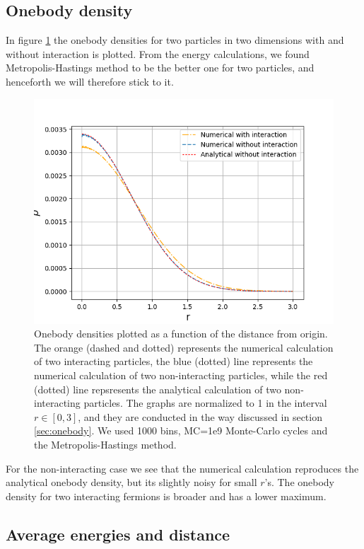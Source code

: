 \documentclass[norsk,a4paper,12pt]{article}
\begin{document}
\subsection{Onebody density}
In figure \ref{fig:OB} the onebody densities for two particles in two dimensions with and without interaction is plotted. From the energy calculations, we found Metropolis-Hastings method to be the better one for two particles, and henceforth we will therefore stick to it. 
 \begin{figure} [H]
 	\centering
 	\includegraphics[scale=0.8]{plots/OB_comparison_MC_1e9.png}
 	\caption{Onebody densities plotted as a function of the distance from origin. The orange (dashed and dotted) represents the numerical calculation of two interacting particles, the blue (dotted) line represents the numerical calculation of two non-interacting particles, while the red (dotted) line repsresents the analytical calculation of two non-interacting particles. The graphs are normalized to 1 in the interval $r\in[0,3]$, and they are conducted in the way discussed in section \ref{sec:onebody}. We used 1000 bins, MC=1e9 Monte-Carlo cycles and the Metropolis-Hastings method.}
 	\label{fig:OB}
 \end{figure}
For the non-interacting case we see that the numerical calculation reproduces the analytical onebody density, but its slightly noisy for small $r$'s. The onebody density for two interacting fermions is broader and has a lower maximum.
 

\subsection{Average energies and distance}
\end{document}
